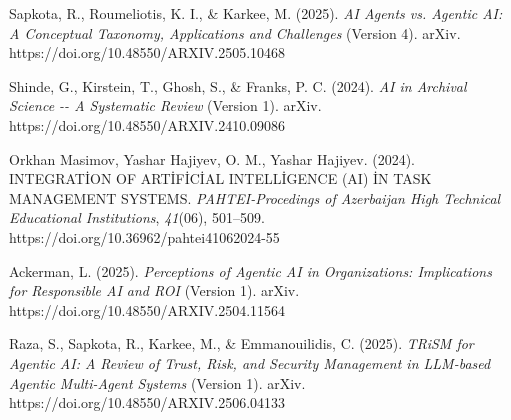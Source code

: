 Sapkota, R., Roumeliotis, K. I., \& Karkee, M. (2025). \emph{AI Agents
vs. Agentic AI: A Conceptual Taxonomy, Applications and Challenges}
(Version 4). arXiv. https://doi.org/10.48550/ARXIV.2505.10468

Shinde, G., Kirstein, T., Ghosh, S., \& Franks, P. C. (2024). \emph{AI
in Archival Science -\/- A Systematic Review} (Version 1). arXiv.
https://doi.org/10.48550/ARXIV.2410.09086

Orkhan Masimov, Yashar Hajiyev, O. M., Yashar Hajiyev. (2024).
INTEGRATİON OF ARTİFİCİAL INTELLİGENCE (AI) İN TASK MANAGEMENT SYSTEMS.
\emph{PAHTEI-Procedings of Azerbaijan High Technical Educational
Institutions}, \emph{41}(06), 501--509.
https://doi.org/10.36962/pahtei41062024-55

Ackerman, L. (2025). \emph{Perceptions of Agentic AI in Organizations:
Implications for Responsible AI and ROI} (Version 1). arXiv.
https://doi.org/10.48550/ARXIV.2504.11564

Raza, S., Sapkota, R., Karkee, M., \& Emmanouilidis, C. (2025).
\emph{TRiSM for Agentic AI: A Review of Trust, Risk, and Security
Management in LLM-based Agentic Multi-Agent Systems} (Version 1). arXiv.
https://doi.org/10.48550/ARXIV.2506.04133
